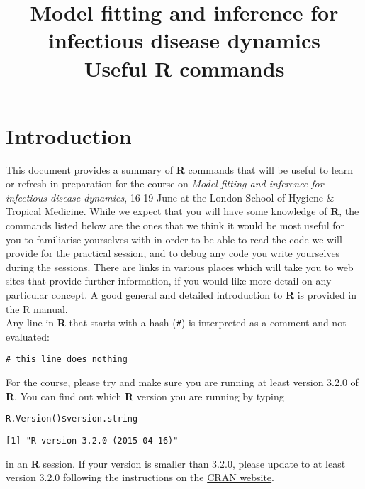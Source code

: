 \documentclass[11pt,a4paper]{article}
\title{}
\date{}
\title{Model fitting and inference for\\ infectious disease dynamics\\\vspace{0.5cm}Useful \textbf{R} commands}
\begin{document}
\maketitle
\tableofcontents

\newpage

\section{Introduction}
\label{sec-1}

This document provides a summary of \textbf{R} commands that will be useful to learn or refresh in preparation for the course on \emph{Model fitting and inference for infectious disease dynamics}, 16-19 June at the London School of Hygiene \& Tropical Medicine. While we expect that you will have some knowledge of \textbf{R}, the commands listed below are the ones that we think it would be most useful for you to familiarise yourselves with in order to be able to read the code we will provide for the practical session, and to debug any code you write yourselves during the sessions. There are links in various places which will take you to web sites that provide further information, if you would like more detail on any particular concept. A good general and detailed introduction to \textbf{R} is provided in the \href{http://cran.r-project.org/doc/manuals/R-intro.html}{R manual}. \\

Any line in \textbf{R} that starts with a hash (\texttt{\#}) is interpreted as a comment and not evaluated: \\

\begin{verbatim}
# this line does nothing
\end{verbatim}

For the course, please try and make sure you are running at least version 3.2.0 of \textbf{R}. You can find out which \textbf{R} version you are running by typing \\

\begin{verbatim}
R.Version()$version.string
\end{verbatim}

\begin{verbatim}
[1] "R version 3.2.0 (2015-04-16)"
\end{verbatim}

in an \textbf{R} session. If your version is smaller than 3.2.0, please update to at least version 3.2.0 following the instructions on the \href{http://cran.rstudio.com/}{CRAN website}. \\
\end{document}
